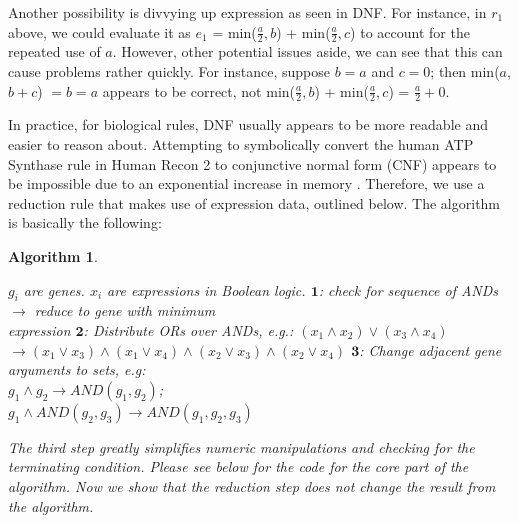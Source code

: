 \documentclass[phd,tocprelim]{cornell}
\theoremstyle{break}
\newtheorem{Algorithm}{Algorithm}
\begin{document}
Another possibility is divvying up expression as seen in DNF. For instance, in $r_1$ above,
we could evaluate it as $e_1$ = min($\frac{a}{2},b$) + min($\frac{a}{2},c$) to account for
the repeated use of $a$. However, other potential issues aside, we can see that this can
cause problems rather quickly. For instance, suppose $b = a$ and $c = 0$; then min($a$,$b+c$) 
$=b=a$ appears to be correct, not min($\frac{a}{2},b$) + min($\frac{a}{2},c$) = $\frac{a}{2} + 0$. 

In practice, for biological rules, DNF usually appears to be more readable and easier to reason about.
Attempting to symbolically convert the human ATP Synthase rule in Human Recon 2 to conjunctive normal form (CNF) 
appears to be impossible due to an exponential increase in memory \cite{Thiele2013}. Therefore, we use a reduction rule
that makes use of expression data, outlined below. The algorithm is basically the following:  \\

\begin{Algorithm}
\label{alg:ReductionToCNF}
\begin{algorithmic}
\REQUIRE $g_i$ are genes. 
\REQUIRE $x_i$ are expressions in Boolean logic.
  \STATE $\mathbf{1}$: check for sequence of ANDs $\rightarrow$ reduce to gene with minimum \\
    \hspace{4.8 mm} expression 
  \STATE $\mathbf{2}$: Distribute ORs over ANDs, e.g.: $(x_1 \land x_2) \lor (x_3 \land x_4)$ \\ 
    \hspace{4.8 mm} $\rightarrow (x_1 \lor x_3) \land (x_1 \lor x_4) \land (x_2 \lor x_3) \land (x_2 \lor x_4)$
  \STATE $\mathbf{3}$: Change adjacent gene arguments to sets, e.g: \\
    \hspace{4.8 mm} $g_1 \land g_2 \rightarrow AND(g_1,g_2)$;  \\
    \hspace{4.8 mm} $g_1 \land AND(g_2,g_3) \rightarrow AND(g_1,g_2,g_3)$ 
\ENDWHILE
\end{algorithmic} 
\vspace{5 mm} 
The third step greatly simplifies numeric manipulations and checking
for the terminating condition. Please see below for the code for the
core part of the algorithm. Now we show that the reduction step does
not change the result from the algorithm.
\end{Algorithm}
\end{document}
